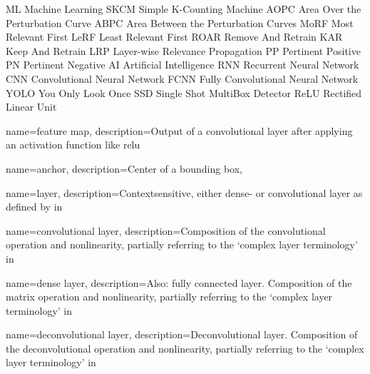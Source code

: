 
 {ML} {Machine Learning}
 {SKCM} {Simple K-Counting Machine}
 {AOPC} {Area Over the Perturbation Curve}
 {ABPC} {Area Between the Perturbation Curves}
 {MoRF} {Most Relevant First}
 {LeRF} {Least Relevant First}
 {ROAR} {Remove And Retrain}
 {KAR} {Keep And Retrain}
 {LRP} {Layer-wise Relevance Propagation}
 {PP} {Pertinent Positive}
 {PN} {Pertinent Negative}
 {AI} {Artificial Intelligence}
 {RNN} {Recurrent Neural Network}
 {CNN} {Convolutional Neural Network}
 {FCNN} {Fully Convolutional Neural Network}
 {YOLO} {You Only Look Once}
 {SSD} {Single Shot MultiBox Detector}
 {ReLU} {Rectified Linear Unit}



 {
    name={feature map},
    description={Output of a convolutional layer after applying an activation function like \gls{relu}}
}

 {
    name={anchor},
    description={Center of a bounding box},
}

 {
    name={layer},
    description={Contextsensitive, either dense- or \gls{convolutional layer} 
    as defined by in}}

 {
    name={convolutional layer},
    description={Composition of the convolutional operation and nonlinearity, 
    partially referring to the `complex layer terminology' 
    in~\cite[341]{IanGoodfellow.2016}}
}

 {
    name={dense layer},
    description={Also: fully connected layer. Composition of the matrix operation and nonlinearity, partially referring to the `complex layer terminology' 
    in~\cite[341]{IanGoodfellow.2016}} 
}

 {
    name={deconvolutional layer},
    description={Deconvolutional layer. Composition of the deconvolutional 
    operation and nonlinearity, partially referring to the `complex layer 
    terminology' 
    in~\cite[341]{IanGoodfellow.2016}} 
}
